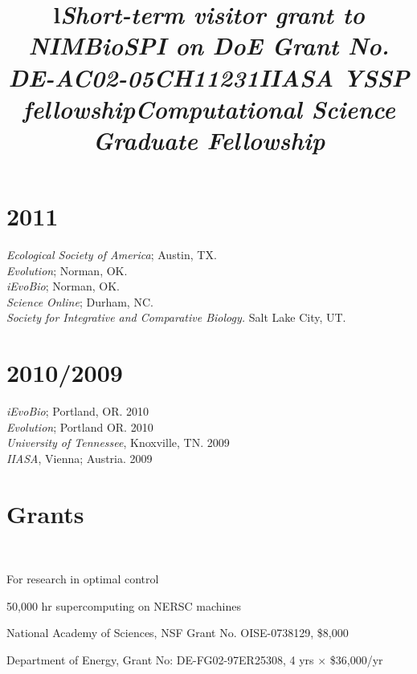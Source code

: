 \documentclass[margin]{res}
\begin{document}
\begin{resume}
\section{\textnormal{2011}}
  \emph{Ecological Society of America}; Austin, TX. \\
  \emph{Evolution}; Norman, OK. \\
  \emph{iEvoBio}; Norman, OK. \\
  \emph{Science Online}; Durham, NC.\\
  \emph{Society for Integrative and Comparative Biology.} Salt Lake City, UT. \\
 \section{\textnormal{2010/2009}}
  \emph{iEvoBio}; Portland, OR. 2010 \\
  \emph{Evolution}; Portland OR. 2010 \\
 \emph{University of Tennessee}, Knoxville, TN. 2009 \\
 \emph{IIASA}, Vienna; Austria. 2009

\section{Grants}
\begin{format}
\title{l} \\
\body
\end{format}

\title{\emph{Short-term visitor grant to NIMBioS}}
\begin{position}
  For research in optimal control
  \vspace{-.25cm}
\end{position}

\title{\emph{PI on DoE Grant No. DE-AC02-05CH11231}}
\begin{position} 
50,000 hr supercomputing on NERSC machines
  \vspace{-.25cm}
\end{position}

\title{\emph{IIASA YSSP fellowship}}
\begin{position} 
  National Academy of Sciences, NSF Grant No. OISE-0738129, \$8,000
  \vspace{-.25cm}
\end{position}

\title{\emph{Computational Science Graduate Fellowship}}
\begin{position} 
  Department of Energy, Grant No: DE-FG02-97ER25308, 4 yrs $\times$ \$36,000/yr
  \vspace{-.25cm}
\end{position}



\end{resume}
\end{document}
